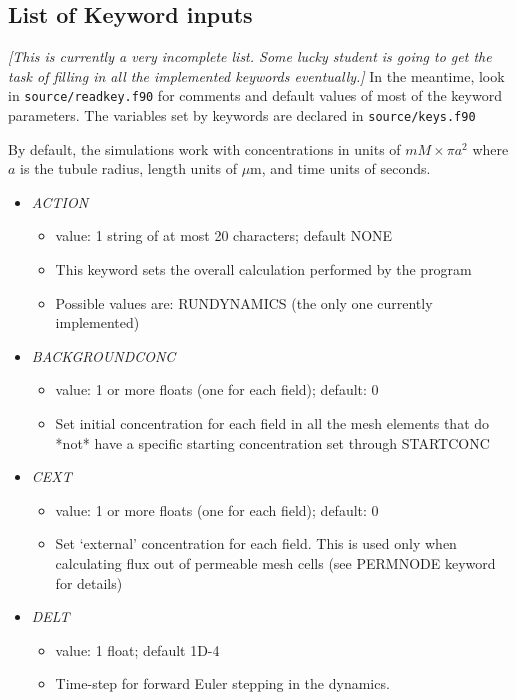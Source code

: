 \documentclass[12pt]{article}
\newcommand{\comment}[1]{{\color{red} \it [#1]}}
\begin{document}
\subsection*{List of Keyword inputs}

\comment{This is currently a very incomplete list. Some lucky student is going to get the task of filling in all the implemented keywords eventually.} In the meantime, look in \verb=source/readkey.f90= for comments and default values of most of the keyword parameters. The variables set by keywords are declared in \verb=source/keys.f90=

By default, the simulations work with concentrations in units of $mM \times \pi a^2$ where $a$ is the tubule radius, length units of $\mu$m, and time units of seconds.

\begin{itemize}
%
\item {\it ACTION}
  \begin{itemize}
    \item  value: 1 string of at most 20 characters; default NONE
    \item This keyword sets the overall calculation performed by the program 
    \item Possible values are: RUNDYNAMICS (the only one currently implemented)
  \end{itemize}
%
\item {\it BACKGROUNDCONC}
\begin{itemize}
	\item  value: 1 or more floats (one for each field); default: 0
	\item Set initial concentration for each field in all the mesh elements that do *not* have a specific starting concentration set through STARTCONC
\end{itemize}
%
\item {\it CEXT}
\begin{itemize}
	\item  value: 1 or more floats (one for each field); default: 0
	\item Set `external' concentration for each field. This is used only when calculating flux out of permeable mesh cells (see PERMNODE keyword for details)
\end{itemize}
%
\item {\it DELT}
    \begin{itemize}
      \item  value: 1 float; default 1D-4
      \item Time-step for forward Euler stepping in the dynamics. 

\end{itemize}
\end{itemize}
\end{document}
